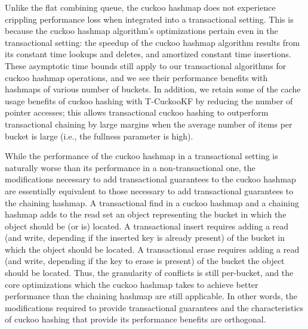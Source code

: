 Unlike the flat combining queue, the cuckoo hashmap does not experience crippling performance loss when integrated into a transactional setting. This is because the cuckoo hashmap algorithm's optimizations pertain even in the transactional setting: the speedup of the cuckoo hashmap algorithm results from its constant time lookups and deletes, and amortized constant time insertions. These asymptotic time bounds still apply to our transactional algorithms for cuckoo hashmap operations, and we see their performance benefits with hashmaps of various number of buckets. In addition, we retain some of the cache usage benefits of cuckoo hashing with T-CuckooKF by reducing the number of pointer accesses; this allows transactional cuckoo hashing to outperform transactional chaining by large margins when the average number of items per bucket is large (i.e., the fullness parameter is high). 

While the performance of the cuckoo hashmap in a transactional setting is naturally worse than its performance in a non-transactional one, the modifications necessary to add transactional guarantees to the cuckoo hashmap are essentially equivalent to those necessary to add transactional guarantees to the chaining hashmap. 
A transactional find in a cuckoo hashmap and a chaining hashmap adds to the read set an object representing the bucket in which the object should be (or is) located.  A transactional insert requires adding a read (and write, depending if the inserted key is already present) of the bucket in which the object should be located. A transactional erase requires adding a read (and write, depending if the key to erase is present) of the bucket the object should be located. Thus, the granularity of conflicts is still per-bucket, and the core optimizations which the cuckoo hashmap takes to achieve better performance than the chaining hashmap are still applicable. In other words, the modifications required to provide transactional guarantees and the characteristics of cuckoo hashing that provide its performance benefits are orthogonal.
